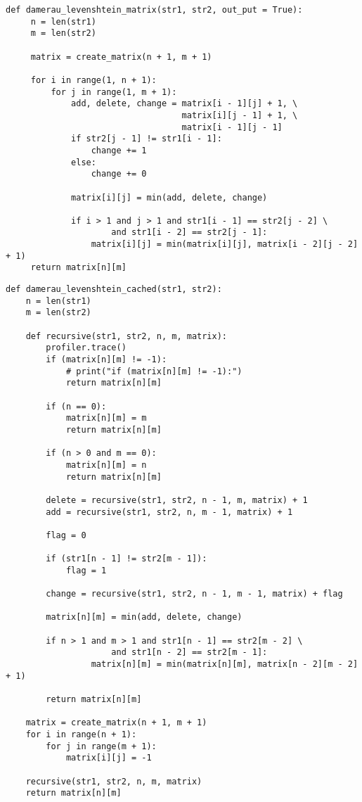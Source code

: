 \begin{lstlisting}[label=lst:dlev_matrix,caption=Функция нахождения расстояния Дамерау Левенштейна с использованием кеша.]
def damerau_levenshtein_matrix(str1, str2, out_put = True):
     n = len(str1)
     m = len(str2)

     matrix = create_matrix(n + 1, m + 1)
     
     for i in range(1, n + 1):
         for j in range(1, m + 1):
             add, delete, change = matrix[i - 1][j] + 1, \
                                   matrix[i][j - 1] + 1, \
                                   matrix[i - 1][j - 1]
             if str2[j - 1] != str1[i - 1]:
                 change += 1
             else:
                 change += 0

             matrix[i][j] = min(add, delete, change)

             if i > 1 and j > 1 and str1[i - 1] == str2[j - 2] \
                     and str1[i - 2] == str2[j - 1]:
                 matrix[i][j] = min(matrix[i][j], matrix[i - 2][j - 2] + 1)
     return matrix[n][m]
\end{lstlisting}

\begin{lstlisting}[label=lst:dlev_matrix_rec,caption=Функция нахождения расстояния Дамерау Левенштейна с использованием кеша и рекурсии.]
def damerau_levenshtein_cached(str1, str2):
    n = len(str1)
    m = len(str2)

    def recursive(str1, str2, n, m, matrix):
        profiler.trace()
        if (matrix[n][m] != -1):
            # print("if (matrix[n][m] != -1):")
            return matrix[n][m]

        if (n == 0):
            matrix[n][m] = m
            return matrix[n][m]

        if (n > 0 and m == 0):
            matrix[n][m] = n
            return matrix[n][m]

        delete = recursive(str1, str2, n - 1, m, matrix) + 1
        add = recursive(str1, str2, n, m - 1, matrix) + 1

        flag = 0

        if (str1[n - 1] != str2[m - 1]):
            flag = 1

        change = recursive(str1, str2, n - 1, m - 1, matrix) + flag

        matrix[n][m] = min(add, delete, change)

        if n > 1 and m > 1 and str1[n - 1] == str2[m - 2] \
                     and str1[n - 2] == str2[m - 1]:
                 matrix[n][m] = min(matrix[n][m], matrix[n - 2][m - 2] + 1)

        return matrix[n][m]

    matrix = create_matrix(n + 1, m + 1)
    for i in range(n + 1):
        for j in range(m + 1):
            matrix[i][j] = -1

    recursive(str1, str2, n, m, matrix)
    return matrix[n][m]

\end{lstlisting}

